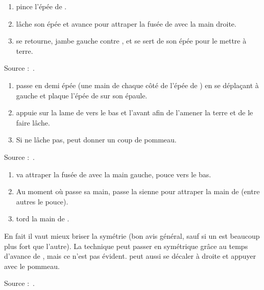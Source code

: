 \begin{technique}

\begin{enumerate}
	\item \A pince l'épée de \D.
	\item \A lâche son épée et avance pour attraper la fusée de \D avec la main droite.
	\item \A se retourne, jambe gauche contre \D, et se sert de son épée pour le mettre à terre.
\end{enumerate}

Source :~\cite{petit:dijon:close_longword:2015}.

\end{technique}


\begin{technique}

\begin{enumerate}
	\item \A passe en demi épée (une main de chaque côté de l'épée de \D) en se déplaçant à gauche et plaque l'épée de \D sur son épaule.
	\item \A appuie sur la lame de \D vers le bas et l'avant afin de l'amener la terre et de le faire lâche.
	\item Si \D ne lâche pas, \A peut donner un coup de pommeau.
\end{enumerate}

Source :~\cite{petit:dijon:close_longword:2015}.

\end{technique}


\begin{technique}

\begin{enumerate}
	\item \A va attraper la fusée de \D avec la main gauche, pouce vers le bas.
	\item Au moment où \A passe sa main, \D passe la sienne pour attraper la main de \A (entre autres le pouce).
	\item \D tord la main de \A.
\end{enumerate}

En fait il vaut mieux briser la symétrie (bon avis général, sauf si un est beaucoup plus fort que l'autre).
La technique peut passer en symétrique grâce au temps d'avance de \D, mais ce n'est pas évident.
\D peut aussi se décaler à droite et appuyer avec le pommeau.

Source :~\cite{petit:dijon:close_longword:2015}.

\end{technique}



